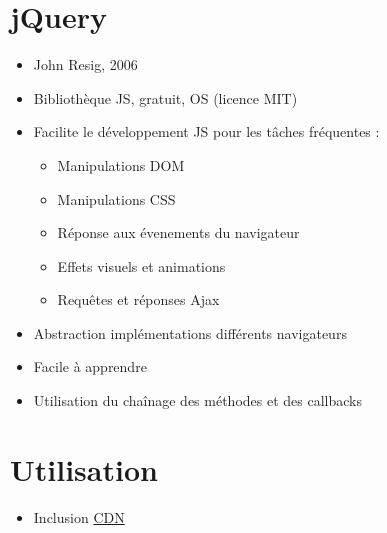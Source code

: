 \hypertarget{jquery}{%
\section{jQuery}\label{jquery}}

\begin{itemize}
\tightlist
\item
  John Resig, 2006
\item
  Bibliothèque JS, gratuit, OS (licence MIT)
\item
  Facilite le développement JS pour les tâches fréquentes :

  \begin{itemize}
  \tightlist
  \item
    Manipulations DOM
  \item
    Manipulations CSS
  \item
    Réponse aux évenements du navigateur
  \item
    Effets visuels et animations
  \item
    Requêtes et réponses Ajax
  \end{itemize}
\item
  Abstraction implémentations différents navigateurs
\item
  Facile à apprendre
\item
  Utilisation du chaînage des méthodes et des callbacks
\end{itemize}

\hypertarget{utilisation}{%
\section{Utilisation}\label{utilisation}}

\begin{itemize}
\tightlist
\item
  Inclusion \href{https://jquery.com/download/\#other-cdns}{CDN}
\end{itemize}

\begin{english}

\begin{Shaded}
\begin{Highlighting}[]
\OperatorTok{\textless{}}\OperatorTok{=}\OperatorTok{\textgreater{}\textless{}/}\OperatorTok{\textgreater{}}
\end{Highlighting}
\end{Shaded}

\end{english}

